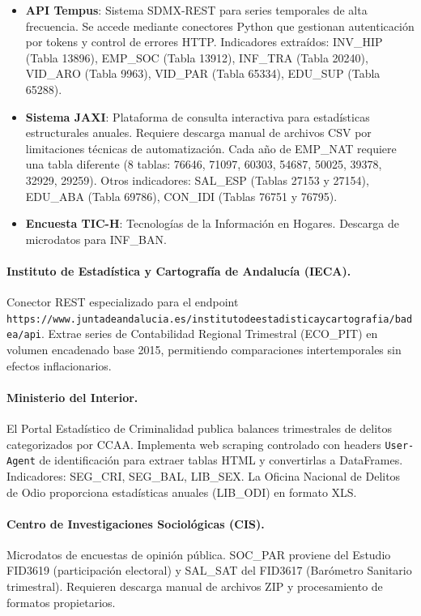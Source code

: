 \documentclass[authoryear,12pt]{elsarticle}
\begin{document}
\begin{itemize}
    \item \textbf{API Tempus}: Sistema SDMX-REST para series temporales de alta frecuencia. Se accede mediante conectores Python que gestionan autenticación por tokens y control de errores HTTP. Indicadores extraídos: INV\_HIP (Tabla 13896), EMP\_SOC (Tabla 13912), INF\_TRA (Tabla 20240), VID\_ARO (Tabla 9963), VID\_PAR (Tabla 65334), EDU\_SUP (Tabla 65288).

    \item \textbf{Sistema JAXI}: Plataforma de consulta interactiva para estadísticas estructurales anuales. Requiere descarga manual de archivos CSV por limitaciones técnicas de automatización. Cada año de EMP\_NAT requiere una tabla diferente (8 tablas: 76646, 71097, 60303, 54687, 50025, 39378, 32929, 29259). Otros indicadores: SAL\_ESP (Tablas 27153 y 27154), EDU\_ABA (Tabla 69786), CON\_IDI (Tablas 76751 y 76795).

    \item \textbf{Encuesta TIC-H}: Tecnologías de la Información en Hogares. Descarga de microdatos para INF\_BAN.
\end{itemize}

\paragraph{Instituto de Estadística y Cartografía de Andalucía (IECA).} Conector REST especializado para el endpoint \texttt{https://www.juntadeandalucia.es/institutodeestadisticaycartografia/badea/api}. Extrae series de Contabilidad Regional Trimestral (ECO\_PIT) en volumen encadenado base 2015, permitiendo comparaciones intertemporales sin efectos inflacionarios.

\paragraph{Ministerio del Interior.} El Portal Estadístico de Criminalidad publica balances trimestrales de delitos categorizados por CCAA. Implementa web scraping controlado con headers \texttt{User-Agent} de identificación para extraer tablas HTML y convertirlas a DataFrames. Indicadores: SEG\_CRI, SEG\_BAL, LIB\_SEX. La Oficina Nacional de Delitos de Odio proporciona estadísticas anuales (LIB\_ODI) en formato XLS.

\paragraph{Centro de Investigaciones Sociológicas (CIS).} Microdatos de encuestas de opinión pública. SOC\_PAR proviene del Estudio FID3619 (participación electoral) y SAL\_SAT del FID3617 (Barómetro Sanitario trimestral). Requieren descarga manual de archivos ZIP y procesamiento de formatos propietarios.
\end{document}
